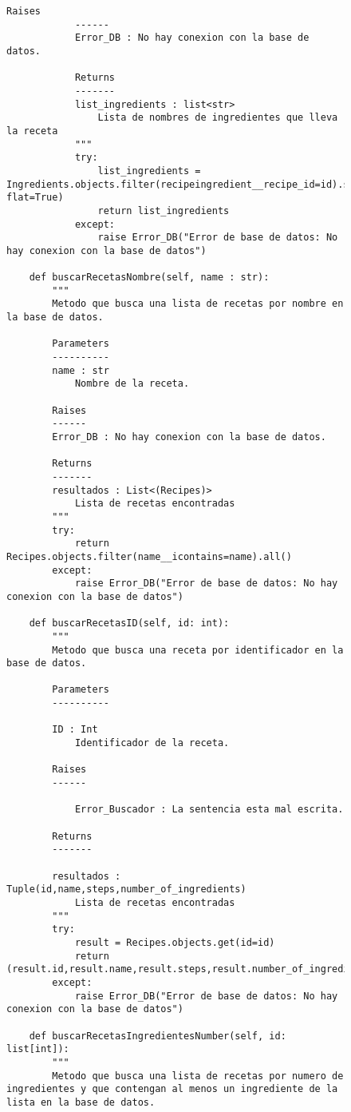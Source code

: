 \begin{figure}[H]
\begin{lstlisting}[style=python]
            Raises
            ------
            Error_DB : No hay conexion con la base de datos.

            Returns
            -------
            list_ingredients : list<str>
                Lista de nombres de ingredientes que lleva la receta
            """
            try:
                list_ingredients = Ingredients.objects.filter(recipeingredient__recipe_id=id).select_related('recipeingredient').values_list('name', flat=True)
                return list_ingredients
            except:
                raise Error_DB("Error de base de datos: No hay conexion con la base de datos")
            
    def buscarRecetasNombre(self, name : str):
        """
        Metodo que busca una lista de recetas por nombre en la base de datos.

        Parameters
        ----------
        name : str
            Nombre de la receta.

        Raises
        ------
        Error_DB : No hay conexion con la base de datos.

        Returns
        -------
        resultados : List<(Recipes)>
            Lista de recetas encontradas
        """
        try:
            return Recipes.objects.filter(name__icontains=name).all()
        except:
            raise Error_DB("Error de base de datos: No hay conexion con la base de datos")

    def buscarRecetasID(self, id: int):
        """
        Metodo que busca una receta por identificador en la base de datos.

        Parameters
        ----------

        ID : Int
            Identificador de la receta.

        Raises
        ------

            Error_Buscador : La sentencia esta mal escrita.

        Returns
        -------
            
        resultados : Tuple(id,name,steps,number_of_ingredients)
            Lista de recetas encontradas
        """
        try:
            result = Recipes.objects.get(id=id)
            return (result.id,result.name,result.steps,result.number_of_ingredients)
        except:
            raise Error_DB("Error de base de datos: No hay conexion con la base de datos")
        
    def buscarRecetasIngredientesNumber(self, id: list[int]):
        """
        Metodo que busca una lista de recetas por numero de ingredientes y que contengan al menos un ingrediente de la lista en la base de datos.


\end{lstlisting}
\end{figure}
